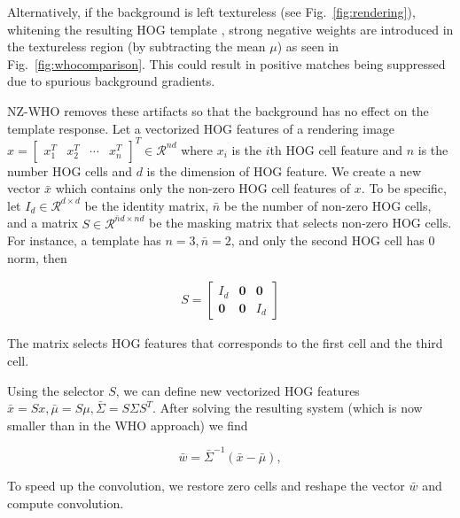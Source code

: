 Alternatively, if the background is left textureless (see
Fig.~\ref{fig:rendering}), whitening the resulting HOG template
, strong negative weights are introduced in the textureless region (by
subtracting the mean $\mu$) as seen in Fig.~\ref{fig:whocomparison}.
This could result in positive matches being suppressed due to spurious
background gradients.

NZ-WHO removes these artifacts so that the background has no effect on the
template response. Let a vectorized HOG features of a rendering image $x = [
\begin{array}{ccccc}x_1^T & x_2^T & \cdots & x_n^T\end{array} ]^T \in
\mathcal{R}^{nd}$ where $x_i$ is the $i$th HOG cell feature and $n$ is the
number HOG cells and $d$ is the dimension of HOG feature. We create a new
vector $\bar{x}$ which contains only the non-zero HOG cell features of $x$. To be
specific, let $I_d\in \mathcal{R}^{d\times d}$ be the identity matrix, $\bar{n}$ be
the number of non-zero HOG cells, and a matrix $S\in \mathcal{R}^{\bar{n}d \times
    nd}$ be the masking matrix that selects non-zero HOG cells. For instance, a
template has  $n=3, \bar{n}=2$, and only the second HOG cell has $0$ norm, then

\begin{align}
    S = \left[ \begin{array}{ccc}
        I_d & \mathbf{0} & \mathbf{0}\\
        \mathbf{0} & \mathbf{0} & I_d
        \end{array} \right]
\end{align}

The matrix selects HOG features that corresponds to the first cell and the third cell. 

Using the selector $S$, we can define new vectorized HOG features $\bar{x} = S x,
\bar{\mu} = S\mu, \bar{\Sigma} = S \Sigma S^T$. After solving the resulting system (which
is now smaller than in the WHO approach) we find

\begin{equation}
    \bar{w}=\bar{\Sigma}^{-1}(\bar{x} - \bar{\mu}) \label{eq:nz-who},
\end{equation}

To speed up the convolution, we restore zero cells and reshape the vector $\bar{w}$
and compute convolution.


